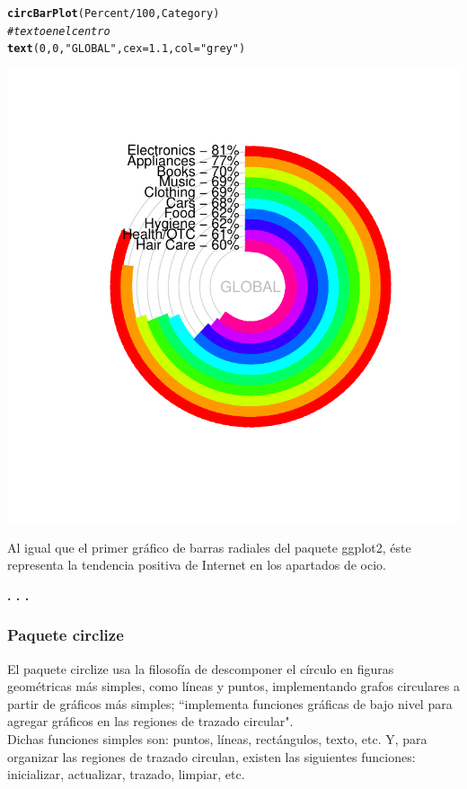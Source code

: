 \documentclass{article}\usepackage[]{graphicx}\usepackage[]{color}
\makeatletter
\def\maxwidth{ %
  \ifdim\Gin@nat@width>\linewidth
    \linewidth
  \else
    \Gin@nat@width
  \fi
}
\newcommand{\hlnum}[1]{\textcolor[rgb]{0.686,0.059,0.569}{#1}}%
\newcommand{\hlstr}[1]{\textcolor[rgb]{0.192,0.494,0.8}{#1}}%
\newcommand{\hlcom}[1]{\textcolor[rgb]{0.678,0.584,0.686}{\textit{#1}}}%
\newcommand{\hlopt}[1]{\textcolor[rgb]{0,0,0}{#1}}%
\newcommand{\hlstd}[1]{\textcolor[rgb]{0.345,0.345,0.345}{#1}}%
\newcommand{\hlkwc}[1]{\textcolor[rgb]{0.333,0.667,0.333}{#1}}%
\newcommand{\hlkwd}[1]{\textcolor[rgb]{0.737,0.353,0.396}{\textbf{#1}}}%
\newenvironment{kframe}{%
 \def\at@end@of@kframe{}%
 \ifinner\ifhmode%
  \def\at@end@of@kframe{\end{minipage}}%
  \begin{minipage}{\columnwidth}%
 \fi\fi%
 \def\FrameCommand##1{\hskip\@totalleftmargin \hskip-\fboxsep
 \colorbox{shadecolor}{##1}\hskip-\fboxsep
     \hskip-\linewidth \hskip-\@totalleftmargin \hskip\columnwidth}%
 \MakeFramed {\advance\hsize-\width
   \@totalleftmargin\z@ \linewidth\hsize
   \@setminipage}}%
 {\par\unskip\endMakeFramed%
 \at@end@of@kframe}
\newenvironment{knitrout}{}{} %
\makeatother
\begin{document}
\begin{knitrout}
\color{fgcolor}\begin{kframe}
\begin{alltt}
\hlkwd{circBarPlot}\hlstd{(Percent}\hlopt{/}\hlnum{100}\hlstd{, Category)}
\hlcom{# texto en el centro}
\hlkwd{text}\hlstd{(}\hlnum{0}\hlstd{,}\hlnum{0}\hlstd{,}\hlstr{"GLOBAL"}\hlstd{,}\hlkwc{cex}\hlstd{=}\hlnum{1.1}\hlstd{,}\hlkwc{col}\hlstd{=}\hlstr{"grey"}\hlstd{)}
\end{alltt}
\end{kframe}

{\centering \includegraphics[width=\maxwidth]{figure/plot_plotrix_cb-1} 

}



\end{knitrout}
Al igual que el primer gr\'afico de barras radiales del paquete ggplot2, \'este representa la tendencia positiva de Internet en los apartados de ocio. 
\begin{center}
\textbf{. . .}
\end{center}
\subsubsection{Paquete circlize}
El paquete circlize usa la filosof\'ia de descomponer el c\'irculo en figuras geom\'etricas m\'as 
simples, como l\'ineas y puntos, implementando grafos circulares a partir de gr\'aficos m\'as 
simples; ``implementa funciones gr\'aficas de bajo nivel para agregar gr\'aficos en las regiones de 
trazado circular".\cite{docu_circlize}
~\\Dichas funciones simples son: puntos, l\'ineas, rect\'angulos, texto, etc. Y, para organizar las 
regiones de trazado circulan, existen las siguientes funciones: inicializar, actualizar, trazado, 
limpiar, etc.~\\
\end{document}
